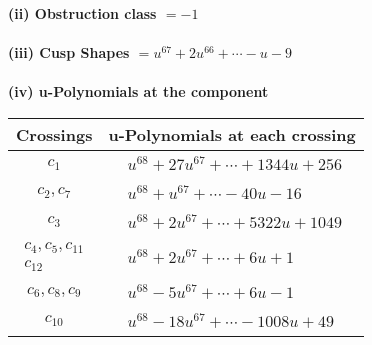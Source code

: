 \documentclass[1p]{elsarticle_modified}
\theoremstyle{definition}
\begin{document}
\flushleft \textbf{(ii) Obstruction class $= -1$}\\~\\
\flushleft \textbf{(iii) Cusp Shapes $= u^{67}+2 u^{66}+\cdots- u-9$}\\~\\
\newpage\renewcommand{\arraystretch}{1}
\flushleft \textbf{(iv) u-Polynomials at the component}\newline \\
\begin{tabular}{m{50pt}|m{274pt}}
Crossings & \hspace{64pt}u-Polynomials at each crossing \\
\hline $$\begin{aligned}c_{1}\end{aligned}$$&$\begin{aligned}
&u^{68}+27 u^{67}+\cdots+1344 u+256
\end{aligned}$\\
\hline $$\begin{aligned}c_{2},c_{7}\end{aligned}$$&$\begin{aligned}
&u^{68}+u^{67}+\cdots-40 u-16
\end{aligned}$\\
\hline $$\begin{aligned}c_{3}\end{aligned}$$&$\begin{aligned}
&u^{68}+2 u^{67}+\cdots+5322 u+1049
\end{aligned}$\\
\hline $$\begin{aligned}c_{4},c_{5},c_{11}\\c_{12}\end{aligned}$$&$\begin{aligned}
&u^{68}+2 u^{67}+\cdots+6 u+1
\end{aligned}$\\
\hline $$\begin{aligned}c_{6},c_{8},c_{9}\end{aligned}$$&$\begin{aligned}
&u^{68}-5 u^{67}+\cdots+6 u-1
\end{aligned}$\\
\hline $$\begin{aligned}c_{10}\end{aligned}$$&$\begin{aligned}
&u^{68}-18 u^{67}+\cdots-1008 u+49
\end{aligned}$\\
\hline
\end{tabular}\\~\\
\end{document}
